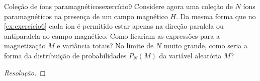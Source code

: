 \begin{exercício}{Coleção de íons paramagnéticos}{exercício9}
    Considere agora uma coleção de \(N\) íons paramagnéticos na presença de um campo magnético \(H\). Da mesma forma que no \cref{ex:exercício6} cada íon é permitido estar apenas na direção paralela ou antiparalela ao campo magnético. Como ficariam as expressões para a magnetização \(M\) e variância totais? No limite de \(N\) muito grande, como seria a forma da distribuição de probabilidades \(P_N(M)\) da variável aleatória \(M\)?
\end{exercício}
\begin{proof}[Resolução]

\end{proof}
